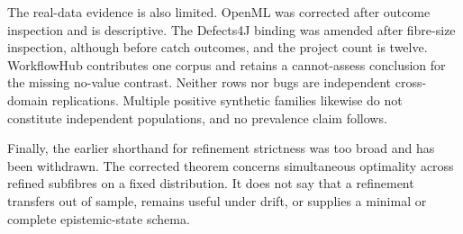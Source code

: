 The real-data evidence is also limited. OpenML was corrected after outcome inspection and is descriptive. The Defects4J binding was amended after fibre-size inspection, although before catch outcomes, and the project count is twelve. WorkflowHub contributes one corpus and retains a cannot-assess conclusion for the missing no-value contrast. Neither rows nor bugs are independent cross-domain replications. Multiple positive synthetic families likewise do not constitute independent populations, and no prevalence claim follows.

Finally, the earlier shorthand for refinement strictness was too broad and has been withdrawn. The corrected theorem concerns simultaneous optimality across refined subfibres on a fixed distribution. It does not say that a refinement transfers out of sample, remains useful under drift, or supplies a minimal or complete epistemic-state schema.
